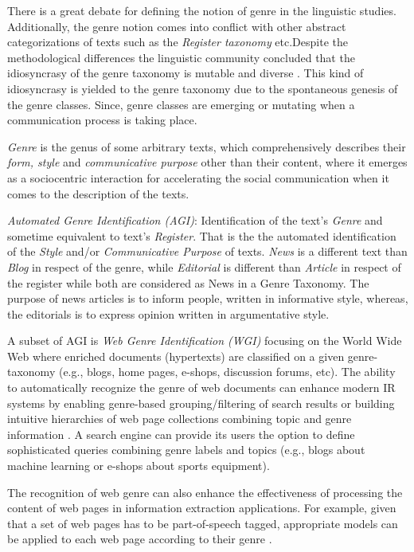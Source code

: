 There is a great debate for defining the notion of genre in the linguistic studies. Additionally, the genre notion comes into conflict with other abstract categorizations of texts such as the \textit{Register taxonomy} etc.Despite the methodological differences the linguistic community concluded that the idiosyncrasy of the genre taxonomy is mutable and diverse \parencite{coutinho2009describe}. This kind of idiosyncrasy is yielded to the genre taxonomy due to the spontaneous genesis of the genre classes. Since, genre classes are emerging or mutating when a communication process is taking place.

\begin{definition}{\textit{Genre}}
is the genus of some arbitrary texts, which comprehensively describes their \textit{form, style} and \textit{communicative purpose} other than their content, where it emerges as a sociocentric interaction for accelerating the social communication when it comes to the description of the texts.
\end{definition}

\textit{Automated Genre Identification (AGI)}: Identification of the text's \textit{Genre} and sometime equivalent to text's \textit{Register}. That is the the automated identification of the \textit{Style} and/or \textit{Communicative Purpose} of texts. \textit{News} is a different text than \textit{Blog} in respect of the genre, while \textit{Editorial} is different than \textit{Article} in respect of the register while both are considered as News in a Genre Taxonomy. The purpose of news articles is to inform people, written in informative style, whereas, the editorials is to express opinion written in argumentative style.

A subset of AGI is \textit{Web Genre Identification (WGI)} focusing on the World Wide Web where enriched documents (hypertexts) are classified on a given genre-taxonomy (e.g., blogs, home pages, e-shops, discussion forums, etc). The ability to automatically recognize the genre of web documents can enhance modern IR systems by enabling genre-based grouping/filtering of search results or building intuitive hierarchies of web page collections combining topic and genre information \parencite{Braslavski2007,Rosso2008,de2009genre}. A search engine can provide its users the option to define sophisticated queries combining genre labels and topics (e.g., blogs about machine learning or e-shops about sports equipment). 

The recognition of web genre can also enhance the effectiveness of processing the content of web pages in information extraction applications. For example, given that a set of web pages has to be part-of-speech tagged, appropriate models can be applied to each web page according to their genre \parencite{Nooralahzadeh2014}.


